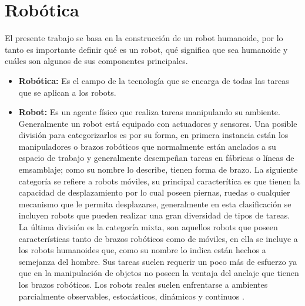 \section{Robótica} \label{sect:robotica}
 
El presente trabajo se basa en la construcción de un robot humanoide, por lo tanto es importante definir qué es un robot, qué significa que sea humanoide y cuáles son algunos de sus componentes principales.

\begin{itemize}
\item{\textbf{Robótica:} Es el campo de la tecnología que se encarga de todas las tareas que se aplican a los robots.}

\item{\textbf{Robot:} Es un agente f\'isico que realiza tareas manipulando su ambiente.
Generalmente un robot está equipado con actuadores y sensores. Una posible divisi\'on para categorizarlos es por su forma, en primera instancia están los manipuladores o brazos rob\'oticos que normalmente están anclados a su espacio de trabajo y generalmente desempeñan tareas en f\'abricas o l\'ineas de emsamblaje; como su nombre lo describe, tienen forma de brazo. La siguiente categor\'ia se refiere a robots móviles, su principal caracter\'itica es que tienen la capacidad de desplazamiento por lo cual poseen piernas, ruedas o cualquier mecanismo que le permita desplazarse, generalmente en esta clasificaci\'on se incluyen robots que pueden realizar una gran diversidad de tipos de tareas. La \'ultima divisi\'on es la categor\'ia mixta, son aquellos robots que poseen caracter\'isticas tanto de brazos rob\'oticos como de móviles, en ella se incluye a los robots humanoides que, como su nombre lo indica están hechos a semejanza del hombre. Sus tareas suelen requerir un poco más de esfuerzo ya que en la manipulaci\'on de objetos no poseen la ventaja del anclaje que tienen los brazos rob\'oticos. Los robots reales suelen enfrentarse a ambientes parcialmente observables, estoc\'asticos, din\'amicos y continuos \cite{peterNorvig}.}



\end{itemize}
